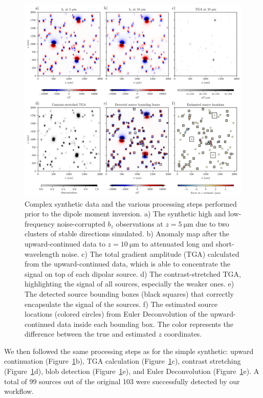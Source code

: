 \begin{figure}[tb!]
  \centering
  \includegraphics[width=1\linewidth]{figures/complex-synthetic-data.png}
  \caption{
    Complex synthetic data and the various processing steps performed prior to the dipole moment inversion.
    a) The synthetic high and low-frequency noise-corrupted $b_z$ observations at
    $z = \qty{5}{\micro\meter}$ due to two clusters of stable directions simulated.
    b) Anomaly map after the upward-continued data to $z = \qty{10}{\micro\meter}$ to attenuated long and short-wavelength noise.
    c) The total gradient amplitude (TGA) calculated from the
    upward-continued data, which is able to concentrate the signal on top
    of each dipolar source.
    d) The contrast-stretched TGA, highlighting the signal of all sources, especially the weaker ones.
    e) The detected source bounding boxes (black squares) that correctly
    encapsulate the signal of the sources.
    f) The estimated source locations (colored circles) from Euler
    Deconvolution of the upward-continued data inside each bounding box.
    The color represents the difference between the true and estimated
    $z$ coordinates.
  }
  \label{complex-synthetic-data}
\end{figure}

We then followed the same processing steps as for the simple synthetic: upward continuation (Figure~\ref{complex-synthetic-data}b),
TGA calculation (Figure~\ref{complex-synthetic-data}c), contrast stretching (Figure~\ref{complex-synthetic-data}d), blob detection (Figure~\ref{complex-synthetic-data}e), and Euler Deconvolution (Figure~\ref{complex-synthetic-data}e).
A total of 99 sources out of the original 103 were successfully detected by our workflow.

